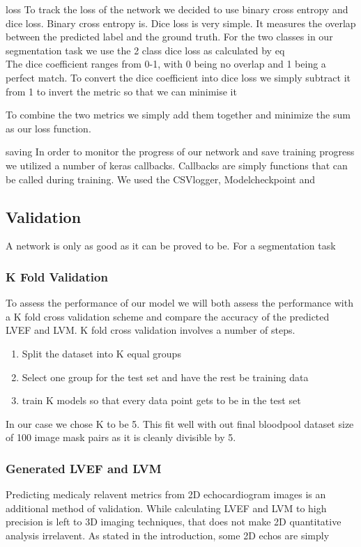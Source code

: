\documentclass[12pt]{article}
\begin{document}
loss
To track the loss of the network we decided to use binary cross entropy and dice loss.
Binary cross entropy is. %
Dice loss is very simple. It measures the overlap between the predicted label and the ground truth.
For the two classes in our segmentation task we use the 2 class dice loss as calculated by eq %
\begin{equation}
\end{equation}
The dice coefficient ranges from 0-1, with 0 being no overlap and 1 being a perfect match.
To convert the dice coefficient into dice loss we simply subtract it from 1 to invert the metric so that we can minimise it

To combine the two metrics we simply add them together and minimize the sum as our loss function.

saving
In order to monitor the progress of our network and save training progress we utilized a number of keras callbacks.
Callbacks are simply functions that can be called during training.
We used the CSVlogger, Modelcheckpoint and

\subsection{Validation}
A network is only as good as it can be proved to be.
For a segmentation task
\subsubsection{K Fold Validation}
To assess the performance of our model we will both assess the performance with a K fold cross validation scheme and compare the accuracy of the predicted LVEF and LVM.
K fold cross validation involves a number of steps.

\begin{enumerate}
	\item{Split the dataset into K equal groups}
	\item{Select one group for the test set and have the rest be training data}
	\item{train K models so that every data point gets to be in the test set}
\end{enumerate}

In our case we chose K to be 5.
This fit well with out final bloodpool dataset size of 100 image mask pairs as it is cleanly divisible by 5.


\subsubsection{Generated LVEF and LVM}
Predicting medicaly relavent metrics from 2D echocardiogram images is an additional method of validation.
While calculating LVEF and LVM to high precision is left to 3D imaging techniques, that does not make 2D quantitative analysis irrelavent.
As stated in the introduction, some 2D echos are simply
\end{document}
